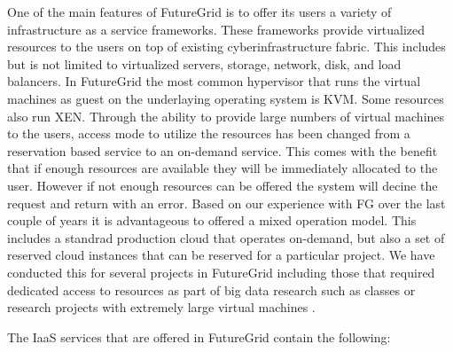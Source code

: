 One of the main features of FutureGrid is to offer its users a variety of infrastructure as a service frameworks. These frameworks provide virtualized resources to the users on top of existing cyberinfrastructure fabric. This includes but is not limited to virtualized servers, storage, network, disk, and load balancers. In FutureGrid the most common hypervisor that runs the virtual machines as guest on the underlaying operating system is KVM. Some resources also run XEN. Through the ability to provide large numbers of virtual machines to the users, access mode to utilize the resources has been changed from a reservation based service to an on-demand service. This comes with the benefit that if enough resources are available they will be immediately allocated to the user. However if not enough resources can be offered the system will decine the request and return with an error. Based on our experience with FG over the last couple of years it is advantageous to offered a mixed operation model. This includes a standrad production cloud that operates on-demand, but also a set of reserved cloud instances that can be reserved for a particular project. We have conducted this for several projects in FutureGrid including those that required dedicated access to resources as part of big data research such as classes \cite{fg405,fg368} or research projects with extremely large virtual machines \cite{fg298}.

The IaaS services that are offered in FutureGrid contain the following:

